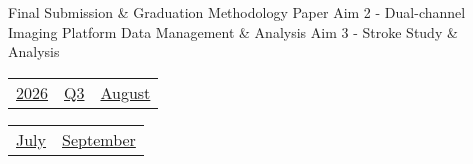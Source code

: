\vfill{\centering{} \small{Final Submission \& Graduation}\hspace{1.5em} \small{Methodology Paper}\hspace{1.5em} \small{Aim 2 - Dual-channel Imaging Platform}\hspace{1.5em} \small{Data Management \& Analysis}\hspace{1.5em} \small{Aim 3 - Stroke Study \& Analysis}\hspace{1.5em}\par}

\pagebreak
{\noindent\Large\renewcommand{\arraystretch}{\myNumArrayStretch}\begin{tabular}{|l|l|l}
\hyperlink{2026}{2026} & \hyperlink{Q3}{Q3} & \hyperlink{August}{August}
\end{tabular}\hfill%
\begin{tabular}{r|r@{}}
\hyperlink{month-2026-7}{July} & \hyperlink{month-2026-9}{September}
\end{tabular}}
\myLineThick
